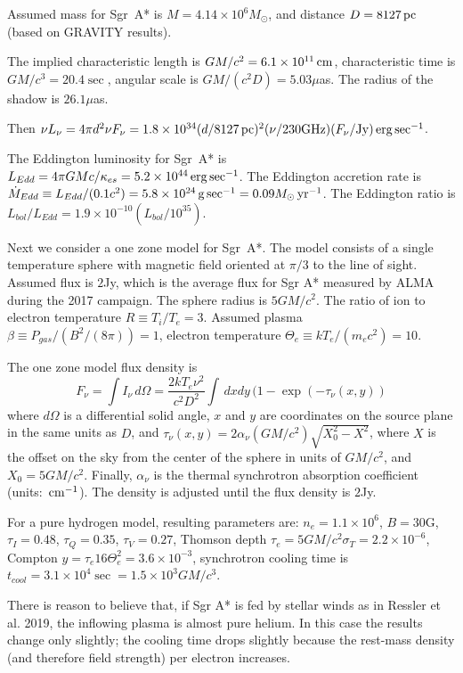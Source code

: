 \documentclass[twocolumn,tighten,dvipsnames]{aastex63}
\newcommand\sgra{Sgr~A*\xspace}
\newcommand\msun{{M_\odot}}
\newcommand\yr{{\rm \, yr}}
\newcommand\erg{{\rm \, erg}}
\newcommand\cm{{\rm \, cm}}
\newcommand\pc{{\rm \, pc}}
\newcommand\gm{{\rm \, g}}
\newcommand\<{{\langle}}
\renewcommand\>{{\rangle}} %
\begin{document}
Assumed mass for \sgra is $M = 4.14 \times 10^6 \msun$, and distance $D = 8127\pc$ (based on GRAVITY results).

The implied characteristic length is $G M/c^2 = 6.1 \times 10^{11} \cm$, characteristic time is $G M/c^3 = 20.4\sec$, angular scale is $G M/(c^2 D) = 5.03\mu$as.  The radius of the shadow is $26.1\mu$as.

Then $\nu L_\nu = 4 \pi d^2 \nu F_\nu = 1.8 \times 10^{34} (d/8127 \pc)^2 (\nu/230 {\rm GHz})(F_\nu/{\rm Jy}) \erg \sec^{-1}$.

The Eddington luminosity for \sgra is $L_{Edd} = 4\pi G M c/\kappa_{es} = 5.2 \times 10^{44} \erg\sec^{-1}$. The Eddington accretion rate is $\dot{M}_{Edd} \equiv  L_{Edd}/(0.1 c^2) = 5.8 \times 10^{24} \gm \sec^{-1} = 0.09 \msun \yr^{-1}$.  The Eddington ratio is $L_{bol}/L_{Edd} = 1.9 \times 10^{-10} (L_{bol}/10^{35})$.

Next we consider a one zone model for \sgra.  The model consists of a single temperature sphere with magnetic field oriented at $\pi/3$ to the line of sight.  Assumed flux is $2$Jy, which is the average flux for Sgr A* measured by ALMA during the 2017 campaign.  The sphere radius is $5 G M/c^2$.  The ratio of ion to electron temperature $R \equiv T_i/T_e = 3$.  Assumed plasma $\beta \equiv  P_{gas}/(B^2/(8\pi)) = 1$, electron temperature $\Theta_e \equiv k T_e/(m_e c^2) = 10$.

The one zone model flux density is
\begin{equation}
    F_\nu = \int I_\nu \, d\Omega = \frac{2 k T_e \nu^2}{c^2 D^2} \int \, dx dy\,  (1 - \exp(-\tau_\nu(x,y))
\end{equation}
where $d\Omega$ is a differential solid angle, $x$ and $y$ are coordinates on the source plane in the same units as $D$, and $\tau_\nu(x,y) = 2 \alpha_\nu (G M/c^2) \sqrt{X_0^2 - X^2}$, where $X$ is the offset on the sky from the center of the sphere in units of $GM/c^2$, and $X_0 = 5 G M/c^2$.  Finally, $\alpha_\nu$ is the thermal synchrotron absorption coefficient (units: $\cm^{-1}$).  The density is adjusted until the flux density is $2$Jy.

For a pure hydrogen model, resulting parameters are: $n_e = 1.1 \times 10^6$, $B = 30$G, $\tau_I = 0.48$, $\tau_Q = 0.35 $, $\tau_V = 0.27$, Thomson depth $\tau_e = 5 G M/c^2 \sigma_T = 2.2 \times 10^{-6}$, Compton $y = \tau_e 16 \Theta_e^2 = 3.6 \times 10^{-3}$, synchrotron cooling time is $t_{cool} = 3.1 \times 10^4\sec = 1.5 \times 10^3 G M/c^3$.

There is reason to believe that, if Sgr A* is fed by stellar winds as in Ressler et al. 2019, the inflowing plasma is almost pure helium.  In this case the results change only slightly; the cooling time drops slightly because the rest-mass density (and therefore field strength) per electron increases.
\end{document}
